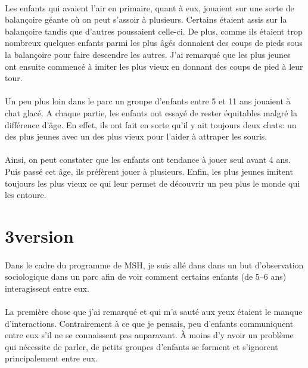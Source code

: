 \paragraph{} Les enfants qui avaient l'air en primaire, quant à eux, jouaient
sur une sorte de balançoire géante où on peut s'assoir à plusieurs. Certains
étaient assis sur la balançoire tandis que d'autres poussaient celle-ci. De
plus, comme ils étaient trop nombreux quelques enfants parmi les plus âgés
donnaient des coups de pieds sous la balançoire pour faire descendre les
autres. J'ai remarqué que les plus jeunes ont ensuite commencé à imiter les
plus vieux en donnant des coups de pied à leur tour.

\paragraph{} Un peu plus loin dans le parc un groupe d'enfants entre 5 et 11
ans jouaient à chat glacé. A chaque partie, les enfants ont essayé de rester
équitables malgré la différence d'âge. En effet, ils ont fait en sorte qu'il y
ait toujours deux chats: un des plus jeunes avec un des plus vieux pour l'aider
à attraper les souris.

\paragraph{} Ainsi, on peut constater que les enfants ont tendance à jouer seul
avant 4 ans. Puis passé cet âge, ils préfèrent jouer à plusieurs. Enfin, les
plus jeunes imitent toujours les plus vieux ce qui leur permet de découvrir un
peu plus le monde qui les entoure.

\section{3\ieme version}

\paragraph{} Dans le cadre du programme de MSH, je suis allé dans dans un but
d'observation sociologique dans un parc afin de voir comment certains enfants
(de 5--6 ans) interagissent entre eux.

\paragraph{} La première chose que j'ai remarqué et qui m'a sauté aux yeux
étaient le manque d'interactions. Contrairement à ce que je pensais, peu
d'enfants communiquent entre eux s'il ne se connaissent pas auparavant. À moins
d'y avoir un problème qui nécessite de parler, de petits groupes d'enfants se
forment et s'ignorent principalement entre eux.

